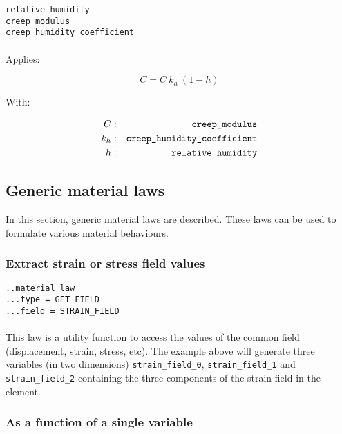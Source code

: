 \documentclass[10pt]{article}
\begin{document}
\noindent \verb+relative_humidity+\\
\verb+creep_modulus+\\
\verb+creep_humidity_coefficient+

\paragraph{}Applies:

\begin{equation}
	C = C\ k_h\ (1-h)
\end{equation}

With:

\begin{eqnarray}
	C & : & \verb+creep_modulus+ \notag \\
	k_h & : & \verb+creep_humidity_coefficient+\notag  \\
	h & : & \verb+relative_humidity+ \notag 
\end{eqnarray}

\subsection{Generic material laws}

In this section, generic material laws are described. These laws can be used to formulate various material behaviours.

\subsubsection{Extract strain or stress field values}

\noindent \verb+..material_law+\\
\verb+...type = GET_FIELD+\\
\verb+...field = STRAIN_FIELD+

\paragraph{}This law is a utility function to access the values of the common field (displacement, strain, stress, etc). The example above will generate three variables (in two dimensions) \verb+strain_field_0+, \verb+strain_field_1+ and \verb+strain_field_2+ containing the three components of the strain field in the element.


\subsubsection{As a function of a single variable}
\end{document}
